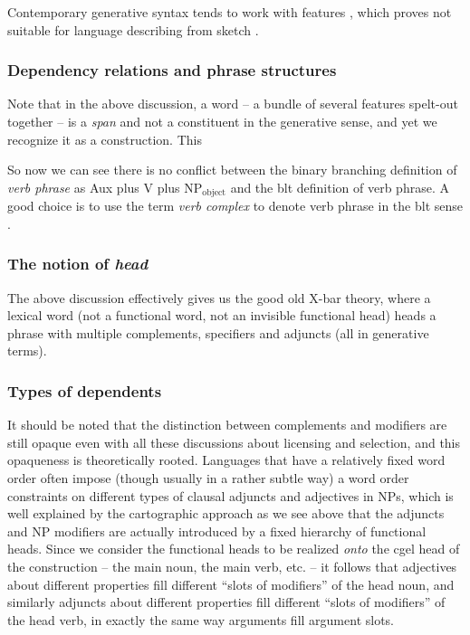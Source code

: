 \documentclass[../main.tex]{subfiles}
\begin{document}
Contemporary generative syntax tends to work with features , which proves not suitable for language describing from sketch \citep{dryer2006descriptive}.

\subsubsection{Dependency relations and phrase structures}

Note that in the above discussion, a word -- a bundle of several features spelt-out together -- is a \emph{span}
and not a constituent in the generative sense, and yet we recognize it as a construction. This %

So now we can see there is no conflict between the binary branching definition of \emph{verb phrase} as Aux plus V plus NP$_\text{object}$ and the \ac{blt} definition of verb phrase. A good choice is to use the term 
\emph{verb complex} to denote verb phrase in the \ac{blt} sense \citep{Wilbur2014}.

\subsubsection{The notion of \emph{head}}\label{sec:headedness}

The above discussion effectively gives us the good old X-bar theory, where a lexical word (not a functional word, 
not an invisible functional head) heads a phrase with multiple complements, specifiers and adjuncts (all in 
generative terms).

\subsubsection{Types of dependents}

It should be noted that the distinction between complements and modifiers are still opaque even with 
all these discussions about licensing and selection, and this opaqueness is theoretically rooted. 
Languages that have a relatively fixed word order often impose (though usually in a rather subtle way) 
a word order constraints on different types of clausal adjuncts and adjectives in NPs, 
which is well explained by the cartographic approach as we see above that the adjuncts and NP modifiers 
are actually introduced by a fixed hierarchy of functional heads. Since we consider the functional heads 
to be realized \emph{onto} the \ac{cgel} head of the construction -- the main noun, the main verb, etc. -- 
it follows that adjectives about different properties fill different ``slots of modifiers'' of the head noun, 
and similarly adjuncts about different properties fill different ``slots of modifiers'' of the head verb, 
in exactly the same way arguments fill argument slots. 
\end{document}
